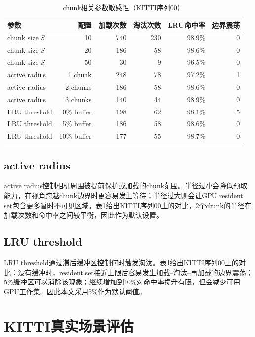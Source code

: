 \begin{table}[htbp]
\centering
\caption{chunk相关参数敏感性（KITTI序列00）}
\label{tab:chunk_param_ablation}
\small
\setlength{\tabcolsep}{3pt}
\begin{tabular}{lrrrrr}
\toprule
\textbf{参数} & \textbf{配置} & \textbf{加载次数} & \textbf{淘汰次数} & \textbf{LRU命中率} & \textbf{边界震荡} \\
\midrule
chunk size $S$ & 10 & 740 & 230 & 98.9\% & 0 \\
chunk size $S$ & 20 & 186 & 58 & 98.6\% & 0 \\
chunk size $S$ & 50 & 30 & 9 & 96.5\% & 0 \\
active radius & 1 chunk & 248 & 78 & 97.2\% & 1 \\
active radius & 2 chunks & 186 & 58 & 98.6\% & 0 \\
active radius & 3 chunks & 140 & 44 & 98.9\% & 0 \\
LRU threshold & 0\% buffer & 198 & 62 & 98.1\% & 5 \\
LRU threshold & 5\% buffer & 186 & 58 & 98.6\% & 0 \\
LRU threshold & 10\% buffer & 177 & 55 & 98.7\% & 0 \\
\bottomrule
\end{tabular}
\end{table}

\subsection{active radius}

active radius控制相机周围被提前保护或加载的chunk范围。半径过小会降低预取能力，在视角跨越chunk边界时更容易发生等待；半径过大则会让GPU resident set包含更多暂时不可见区域。表\ref{tab:chunk_param_ablation}给出KITTI序列00上的对比，2个chunk的半径在加载次数和命中率之间较平衡，因此作为默认设置。

\subsection{LRU threshold}

LRU threshold通过滞后缓冲区控制何时触发淘汰。表\ref{tab:chunk_param_ablation}给出KITTI序列00上的对比：没有缓冲时，resident set接近上限后容易发生加载--淘汰--再加载的边界震荡；5\%缓冲区可以消除该现象；继续增加到10\%对命中率提升有限，但会减少可用GPU工作集。因此本文采用5\%作为默认阈值。

\section{KITTI真实场景评估}

